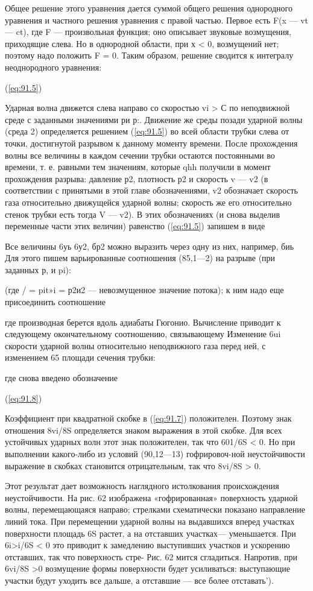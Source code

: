 Общее решение этого уравнения дается суммой общего решения однородного
уравнения и частного решения уравнения с правой частью. Первое есть F(x — vt —
ct), где F — произвольная функция; оно описывает звуковые возмущения,
приходящие слева. Но в однородной области, при х < 0, возмущений нет; поэтому
надо положить F = 0. Таким образом, решение сводится к интегралу неоднородного
уравнения:

(\ref{eq:91.5})

Ударная волна движется слева направо со скоростью vi > С по неподвижной среде
с заданными значениями ри р:. Движение же среды позади ударной волны (среда 2)
определяется решением (\ref{eq:91.5}) во всей области трубки слева от точки, достигнутой
разрывом к данному моменту времени. После прохождения волны все величины в
каждом сечении трубки остаются постоянными во времени, т. е. равными тем
значениям, которые qhh получили в момент прохождения разрыва: давление р2,
плотность р2 и скорость v — v2 (в соответствии с принятыми в этой главе
обозначениями, v2 обозначает скорость газа относительно движущейся ударной
волны; скорость же его относительно стенок трубки есть тогда V — v2). В этих
обозначениях (и снова выделив переменные части этих величин) равенство (\ref{eq:91.5})
запишем в виде


Все величины 6уь 6у2, бр2 можно выразить через одну из них, например, биь Для
этого пишем варьированные соотношения (85,1—2) на разрыве (при заданных р, и
pi):


(где / = pit»i = р2и2 — невозмущенное значение потока); к ним надо еще
присоединить соотношение

где производная берется вдоль адиабаты Гюгонио. Вычисление приводит к
следующему окончательному соотношению, связывающему Изменение 6ui скорости
ударной волны относительно неподвижного газа перед ней, с изменением 65 площади
сечения трубки:


где снова введено обозначение

(\ref{eq:91.8})


Коэффициент при квадратной скобке в (\ref{eq:91.7}) положителен. Поэтому знак отношения
8vi/8S определяется знаком выражения в этой скобке. Для всех устойчивых ударных
волн этот знак положителен, так что 601/6S < 0. Но при выполнении какого-либо
из условий (90,12—13) гофрировоч-ной неустойчивости выражение в скобках
становится отрицательным, так что 8vi/8S > 0.

Этот результат дает возможность наглядного истолкования происхождения
неустойчивости. На рис. 62 изображена «гофрированная» поверхность ударной
волны, перемещающаяся направо; стрелками схематически показано направление
линий тока. При перемещении ударной волны на выдавшихся вперед участках
поверхности площадь 6S растет, а на отставших участках— уменьшается. При
6i>i/6S < 0 это приводит к замедлению выступивших участков и ускорению
отставших, так что поверхность стре- Рис. 62 мится сгладиться. Напротив, при
6vi/8S >0 возмущение формы поверхности будет усиливаться: выступающие участки
будут уходить все дальше, а отставшие — все более отставать').
